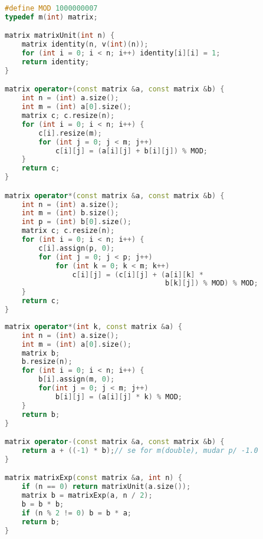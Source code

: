 \begin{lstlisting}[language=C++]
#define MOD 1000000007
typedef m(int) matrix;

matrix matrixUnit(int n) {
    matrix identity(n, v(int)(n));
    for (int i = 0; i < n; i++) identity[i][i] = 1;
    return identity;
}

matrix operator+(const matrix &a, const matrix &b) {
    int n = (int) a.size();
    int m = (int) a[0].size();
    matrix c; c.resize(n);
    for (int i = 0; i < n; i++) {
        c[i].resize(m);
        for (int j = 0; j < m; j++)
            c[i][j] = (a[i][j] + b[i][j]) % MOD;
    }
    return c;
}

matrix operator*(const matrix &a, const matrix &b) {
    int n = (int) a.size();
    int m = (int) b.size();
    int p = (int) b[0].size();
    matrix c; c.resize(n);
    for (int i = 0; i < n; i++) {
        c[i].assign(p, 0);
        for (int j = 0; j < p; j++)
            for (int k = 0; k < m; k++)
                c[i][j] = (c[i][j] + (a[i][k] * 
                                      b[k][j]) % MOD) % MOD;
    }
    return c;
}
\end{lstlisting}

\newpage

\begin{lstlisting}[language=C++, title=Operações com Matrizes (cont.)]
matrix operator*(int k, const matrix &a) {
    int n = (int) a.size();
    int m = (int) a[0].size();
    matrix b;
    b.resize(n);
    for (int i = 0; i < n; i++) {
        b[i].assign(m, 0);
        for(int j = 0; j < m; j++)
            b[i][j] = (a[i][j] * k) % MOD;
    }
    return b;
}

matrix operator-(const matrix &a, const matrix &b) {
    return a + ((-1) * b);// se for m(double), mudar p/ -1.0
}

matrix matrixExp(const matrix &a, int n) {
    if (n == 0) return matrixUnit(a.size());
    matrix b = matrixExp(a, n / 2);
    b = b * b;
    if (n % 2 != 0) b = b * a;
    return b;
}
\end{lstlisting}